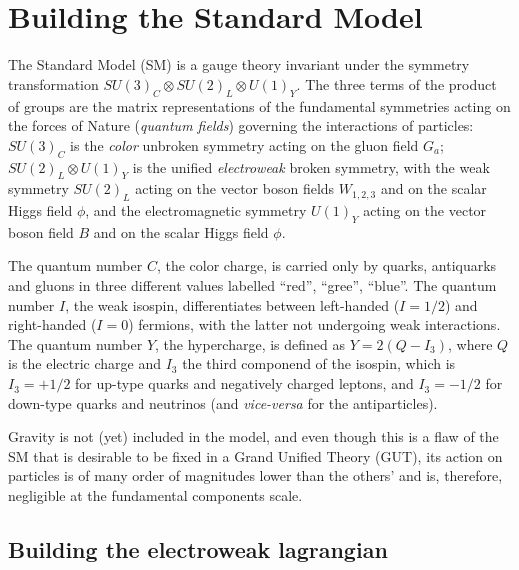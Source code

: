 \section{Building the Standard Model}\label{sec:THlagr}

The Standard Model (SM) is a gauge theory invariant under the symmetry 
transformation $SU(3)_{C} \otimes SU(2)_{L} \otimes U(1)_{Y}$. The
three terms of the product of groups are the matrix representations
of the fundamental symmetries acting on the forces of Nature ({\it quantum fields})
governing the interactions of particles: 
$SU(3)_{C}$ is the {\it color} unbroken 
symmetry %
 acting on the gluon field $G_a$; 
$SU(2)_{L} \otimes U(1)_{Y}$ is the unified {\it electroweak} broken 
symmetry, %
with the weak symmetry $SU(2)_{L}$
acting on the vector boson fields $W_{1,2,3}$ and on the scalar Higgs field $\phi$,
and the electromagnetic symmetry $U(1)_{Y}$ %
acting on the vector boson field $B$ and on the scalar Higgs field $\phi$.

The quantum number $C$, the color charge, is carried only by
quarks, antiquarks and gluons 
in three different values labelled ``red'', ``gree'', ``blue''.
The quantum number $I$, the weak isospin, differentiates between left-handed
($I=1/2$) and right-handed ($I=0$) fermions, with the latter not undergoing weak interactions.
The quantum number $Y$, the hypercharge, is defined as $Y=2(Q-I_3)$, 
where $Q$ is the electric charge and $I_3$ the third componend of the isospin,
which is $I_3=+1/2$ for up-type quarks and negatively charged leptons, and
 $I_3=-1/2$ for down-type quarks and neutrinos (and {\it vice-versa} for the antiparticles).


Gravity is not (yet) included in the model, and even though
this is a flaw of the SM that is desirable to be fixed in a 
Grand Unified Theory (GUT), its action on particles is of many order
of magnitudes lower than the others' and is, therefore, negligible at the
fundamental components scale.


\subsection{Building the electroweak lagrangian}\label{sec:ewlagr}


